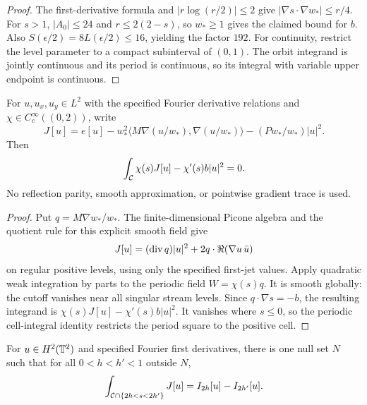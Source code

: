 \begin{proof}
\leanok
The first-derivative formula and $|r\log(r/2)|\le2$ give
$|\nabla s\cdot\nabla w_*|\le r/4$.
For $s>1$, $|A_0|\le24$ and $r\le2(2-s)$, so $w_*\ge1$
gives the claimed bound for $b$.
Also $S(\epsilon/2)=8L(\epsilon/2)\le16$, yielding the factor $192$.
For continuity, restrict the level parameter to a compact subinterval
of $(0,1)$. The orbit integrand is jointly continuous and its period
is continuous, so its integral with variable upper endpoint is continuous.
\end{proof}

\begin{lemma}
\label{lem:dd-picone-cutoff}
\leanok
For $u,u_x,u_y\in L^2$ with the specified Fourier derivative relations
and $\chi\in C^\infty_c((0,2))$, write
\[
 J[u]=e[u]-w_*^2\langle M\nabla(u/w_*),\nabla(u/w_*)\rangle
          -(Pw_*/w_*)|u|^2.
\]
Then
\[
 \int_{\mathcal{C}} \chi(s)J[u]-\chi'(s)b|u|^2=0.
\]
No reflection parity, smooth approximation, or pointwise gradient trace is used.
\end{lemma}

\begin{proof}
\leanok
Put $q=M\nabla w_*/w_*$. The finite-dimensional Picone algebra and
the quotient rule for this explicit smooth field give
\[
 J[u]=(\operatorname{div} q)|u|^2+2q\cdot\Re(\nabla u\,\bar u)
\]
on regular positive levels, using only the specified first-jet values.
Apply quadratic weak integration by parts to the periodic field
$W=\chi(s)q$. It is smooth globally: the cutoff vanishes near all
singular stream levels. Since $q\cdot\nabla s=-b$, the resulting
integrand is $\chi(s)J[u]-\chi'(s)b|u|^2$.
It vanishes where $s\le0$, so the periodic cell-integral identity
restricts the period square to the positive cell.
\end{proof}

\begin{lemma}
\label{lem:dd-picone-annular}
\leanok
For $u\in H^2(\mathbb{T}^2)$ and specified Fourier first derivatives, there is
one null set $N$ such that for all $0<h<h'<1$ outside $N$,
\[
 \int_{\mathcal{C}\cap\{2h<s<2h'\}}J[u]=I_{2h}[u]-I_{2h'}[u].
\]
\end{lemma}

